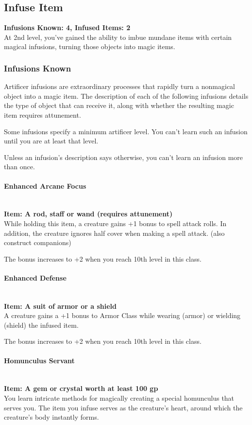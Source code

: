 \documentclass[letterpaper,openany,oneside,twocolumn]{book}
\begin{document}
\subsection*{Infuse Item}
\textbf{Infusions Known: 4, Infused Items: 2}\\
At 2nd level, you've gained the ability to imbue mundane items with certain magical infusions, turning those objects into magic items.
\subsubsection*{Infusions Known}
Artificer infusions are extraordinary processes that rapidly turn a nonmagical object into a magic item. The description of each of the following infusions details the type of object that can receive it, along with whether the resulting magic item requires attunement.

Some infusions specify a minimum artificer level. You can't learn such an infusion until you are at least that level.

Unless an infusion's description says otherwise, you can't learn an infusion more than once.

\paragraph*{Enhanced Arcane Focus}\hfill\\
\textbf{Item: A rod, staff or wand (requires attunement)}\\
While holding this item, a creature gains +1 bonus to spell attack rolls. In addition, the creature ignores half cover when making a spell attack. (also construct companions)

The bonus increases to +2 when you reach 10th level in this class.
\paragraph*{Enhanced Defense}\hfill\\
\textbf{Item: A suit of armor or a shield}\\
A creature gains a +1 bonus to Armor Class while wearing (armor) or wielding (shield) the infused item.

The bonus increases to +2 when you reach 10th level in this class.
\paragraph*{Homunculus Servant}\hfill\\
\textbf{Item: A gem or crystal worth at least 100 gp}\\
You learn intricate methods for magically creating a special homunculus that serves you. The item you infuse serves as the creature's heart, around which the creature's body instantly forms.
\end{document}
